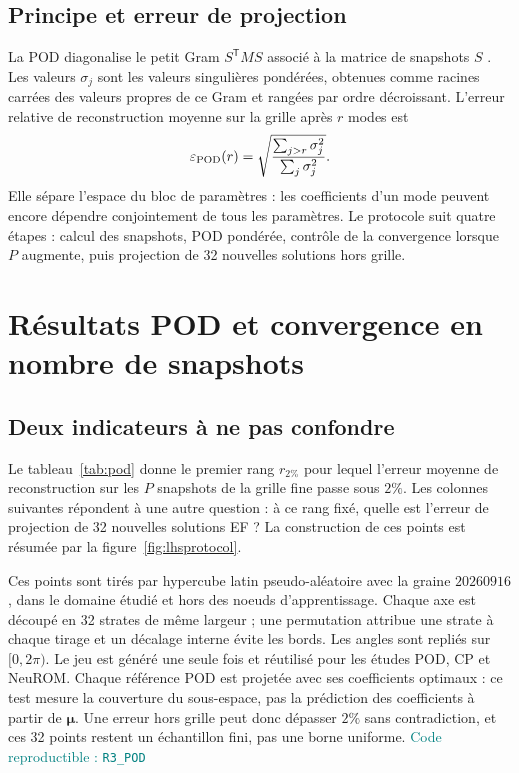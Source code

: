 \documentclass[10pt,a4paper]{article}
\newcommand{\codecell}[1]{\textcolor{teal}{\textsf{Code reproductible : \texttt{#1}}}}
\begin{document}
\subsection{Principe et erreur de projection}
La POD diagonalise le petit Gram $S^\mathsf{T}MS$ associé à la matrice de snapshots $S$ \cite{sirovich}. Les valeurs $\sigma_j$ sont les valeurs singulières pondérées, obtenues comme racines carrées des valeurs propres de ce Gram et rangées par ordre décroissant. L'erreur relative de reconstruction moyenne sur la grille après $r$ modes est
\[
\varepsilon_{\rm POD}(r)=\sqrt{\frac{\sum_{j>r}\sigma_j^2}{\sum_j\sigma_j^2}}.
\]
Elle sépare l'espace du bloc de paramètres : les coefficients d'un mode peuvent encore dépendre conjointement de tous les paramètres. Le protocole suit quatre étapes : calcul des snapshots, POD pondérée, contrôle de la convergence lorsque $P$ augmente, puis projection de 32 nouvelles solutions hors grille.

\section{Résultats POD et convergence en nombre de snapshots}
\subsection{Deux indicateurs à ne pas confondre}
Le tableau~\ref{tab:pod} donne le premier rang $r_{2\%}$ pour lequel l'erreur moyenne de reconstruction sur les $P$ snapshots de la grille fine passe sous $2\%$. Les colonnes suivantes répondent à une autre question : à ce rang fixé, quelle est l'erreur de projection de 32 nouvelles solutions EF ? La construction de ces points est résumée par la figure~\ref{fig:lhsprotocol}.

Ces points sont tirés par hypercube latin pseudo-aléatoire avec la graine $20260916$, dans le domaine étudié et hors des noeuds d'apprentissage. Chaque axe est découpé en 32 strates de même largeur ; une permutation attribue une strate à chaque tirage et un décalage interne évite les bords. Les angles sont repliés sur $[0,2\pi)$. Le jeu est généré une seule fois et réutilisé pour les études POD, CP et NeuROM. Chaque référence POD est projetée avec ses coefficients optimaux : ce test mesure la couverture du sous-espace, pas la prédiction des coefficients à partir de $\bm\mu$. Une erreur hors grille peut donc dépasser $2\%$ sans contradiction, et ces 32 points restent un échantillon fini, pas une borne uniforme. \codecell{R3\_POD}
\end{document}
